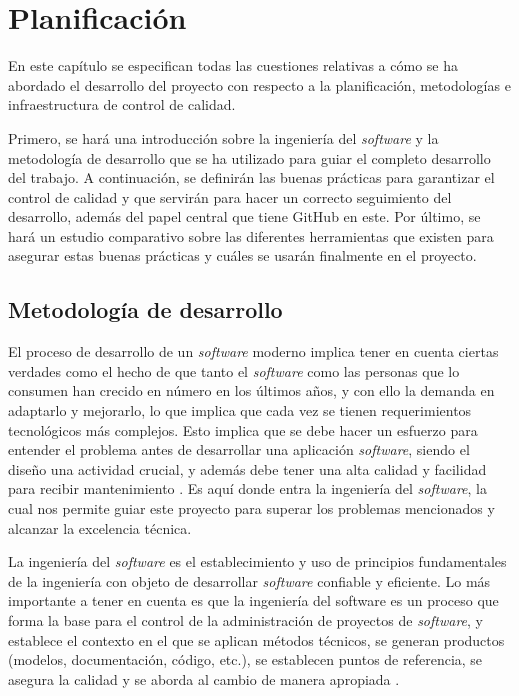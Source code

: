 \chapter{Planificación}
En este capítulo se especifican todas las cuestiones relativas a cómo se ha
abordado el desarrollo del proyecto con respecto a la planificación,
metodologías e infraestructura de control de calidad. 

Primero, se hará una introducción sobre la ingeniería del \textit{software} y la
metodología de desarrollo que se ha utilizado para guiar el completo desarrollo
del trabajo. A continuación, se definirán las buenas prácticas para garantizar
el control de calidad y que servirán para hacer un correcto seguimiento del
desarrollo, además del papel central que tiene GitHub en este. Por último, se
hará un estudio comparativo sobre las diferentes herramientas que existen para
asegurar estas buenas prácticas y cuáles se usarán finalmente en el proyecto.

\section{Metodología de desarrollo}
El proceso de desarrollo de un \textit{software} moderno implica tener en cuenta
ciertas verdades como el hecho de que tanto el \textit{software} como las
personas que lo consumen han crecido en número en los últimos años, y con ello
la demanda en adaptarlo y mejorarlo, lo que implica que cada vez se tienen
requerimientos tecnológicos más complejos. Esto implica que se debe hacer un
esfuerzo para entender el problema antes de desarrollar una aplicación
\textit{software}, siendo el diseño una actividad crucial, y además debe tener
una alta calidad y facilidad para recibir mantenimiento
\cite{pressman_software_2015}. Es aquí donde entra la ingeniería del
\textit{software}, la cual nos permite guiar este proyecto para superar los
problemas mencionados y alcanzar la excelencia técnica.

La ingeniería del \textit{software} es el establecimiento y uso de principios
fundamentales de la ingeniería con objeto de desarrollar \textit{software}
confiable y eficiente. Lo más importante a tener en cuenta es que la ingeniería
del software es un proceso que forma la base para el control de la
administración de proyectos de \textit{software}, y establece el contexto en el
que se aplican métodos técnicos, se generan productos (modelos, documentación,
código, etc.), se establecen puntos de referencia, se asegura la calidad y se
aborda al cambio de manera apropiada \cite{pressman_software_2015}.


